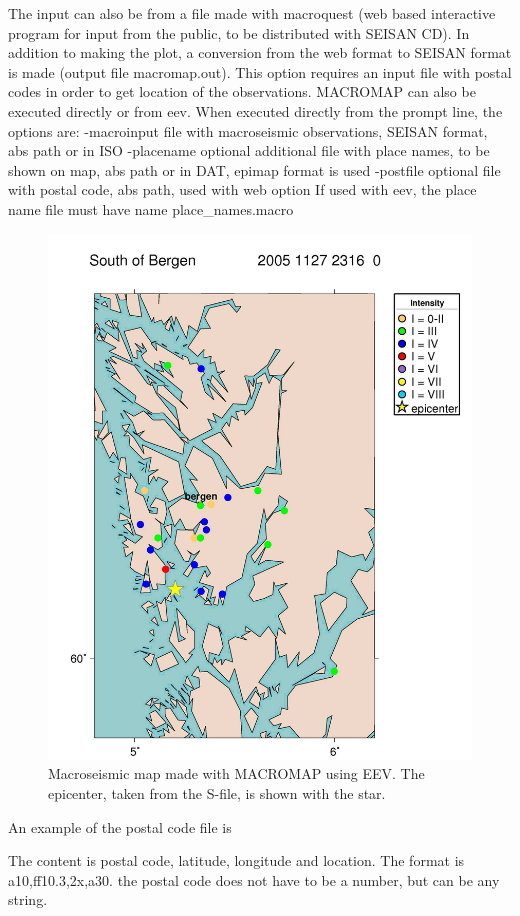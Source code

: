 The input can also be from a file made with macroquest (web based interactive program for input from the public, to be distributed with SEISAN CD). In addition to making the plot, a conversion from the web format to SEISAN format is made (output file macromap.out). This option requires an input file with postal codes in order to get location of the observations. 
MACROMAP can also be executed directly or from eev. When executed directly from the prompt line, the options are: 
-macroinput file with macroseismic observations, SEISAN format, abs path or in ISO -placename optional additional file with place names, to be shown on map, abs path or in DAT,  
                         epimap format is used -postfile optional file with postal code, abs path, used with web option  
If used with eev, the place name file must have name place\_names.macro  

\begin{figure}
\centerline{\includegraphics[width=0.9\linewidth]{fig/fig52}}
\caption{Macroseismic map made with MACROMAP using EEV. 
The epicenter, taken from the S-file, is shown with the star.}
\end{figure}

An example of the postal code file is 



The content is postal code, latitude, longitude and location. The format is a10,ff10.3,2x,a30. the postal code does not have to be a number, but can be any string. 

